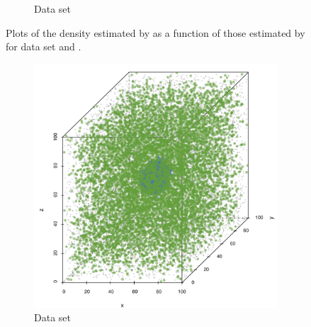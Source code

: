 \begin{figure}
\begin{subfigure}{0.3\textwidth}
				\caption{Data set \baakmanThree}
				\label{fig:discussion:performance:mbevssambe:baakman3}
			\end{subfigure}	
			\caption{Plots of the density estimated by \sambe as a function of those estimated by \mbe for data set %
				\ferdosiThree and %
				\baakmanThree.
			}
			\label{fig:discussion:performance:four:mbevssambe}
		\end{figure}

		\begin{figure}
			\centering
			\begin{subfigure}{0.23\textwidth}
				\centering
				\includegraphics[keepaspectratio=true, width=\textwidth, height=0.23\textheight]{discussion/img/ferdosi_1_abs_error_mbeSmallerThansambe}
				\caption{Data set \ferdosiOne}
				\label{fig:discussion:performance:mbeLowerError:ferdosi1}
			\end{subfigure}
			\begin{subfigure}{0.23\textwidth}
				\centering

\end{subfigure}
\end{figure}
